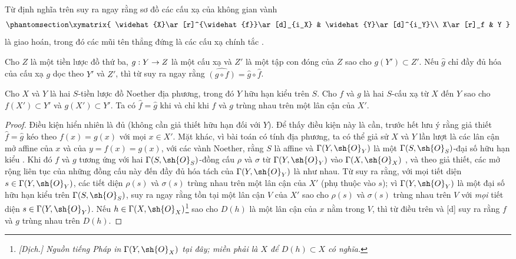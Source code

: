\documentclass[oneside]{amsart}
\makeatletter
\newcommand{\ega@arrow}[2]{\mathchoice{#1}{#2}{#2}{#2}}
\renewcommand{\to}{\ega@arrow{\longrightarrow}{\rightarrow}}
\let\EGAOriginalLabel\label
\renewcommand{\label}[1]{\phantomsection\EGAOriginalLabel{#1}}
\makeatother
\begin{document}
\begin{env}[10.9.2]
\label{I.10.9.2}
Từ định nghĩa trên suy ra ngay rằng sơ đồ các cấu xạ của không gian vành
\[
  \label{I.10.9.2.1}
  \xymatrix{
    \widehat{X}\ar[r]^{\widehat{f}}\ar[d]_{i_X} &
    \widehat{Y}\ar[d]^{i_Y}\\
    X\ar[r]_f &
    Y
  }
\]
là giao hoán, trong đó các mũi tên thẳng đứng là các cấu xạ chính tắc .
\end{env}

\begin{env}[10.9.3]
\label{I.10.9.3}
Cho $Z$ là một tiền lược đồ thứ ba, $g:Y\to Z$ là một cấu xạ và $Z'$ là một tập con đóng của $Z$ sao cho $g(Y')\subset Z'$.
Nếu $\widehat{g}$ chỉ đầy đủ hóa của cấu xạ $g$ dọc theo $Y'$ và $Z'$, thì từ  suy ra ngay rằng
$\widehat{(g\circ f)}=\widehat{g}\circ\widehat{f}$.
\end{env}

\begin{proposition}[10.9.4]
\label{I.10.9.4}
Cho $X$ và $Y$ là hai $S$-tiền lược đồ Noether địa phương, trong đó $Y$ hữu hạn kiểu trên $S$.
Cho $f$ và $g$ là hai $S$-cấu xạ từ $X$ đến $Y$ sao cho $f(X')\subset Y'$ và $g(X')\subset Y'$.
Ta có $\widehat{f}=\widehat{g}$ khi và chỉ khi $f$ và $g$ trùng nhau trên một lân cận của $X'$.
\end{proposition}

\begin{proof}
Điều kiện hiển nhiên là đủ (không cần giả thiết hữu hạn đối với $Y$).
Để thấy điều kiện này là cần, trước hết lưu ý rằng giả thiết $\widehat{f}=\widehat{g}$ kéo theo $f(x)=g(x)$ với mọi $x\in X'$.
Mặt khác, vì bài toán có tính địa phương, ta có thể giả sử $X$ và $Y$ lần lượt là các lân cận mở affine của $x$ và của $y=f(x)=g(x)$, với các vành Noether, rằng $S$ là affine và $\Gamma(Y,\sh{O}_Y)$ là một $\Gamma(S,\sh{O}_S)$-đại số hữu hạn kiểu .
Khi đó $f$ và $g$ tương ứng với hai $\Gamma(S,\sh{O}_S)$-đồng cấu $\rho$ và $\sigma$ từ $\Gamma(Y,\sh{O}_Y)$ vào $\Gamma(X,\sh{O}_X)$ , và theo giả thiết, các mở rộng liên tục của những đồng cấu này đến đầy đủ hóa tách của $\Gamma(Y,\sh{O}_Y)$ là như nhau.
Từ  suy ra rằng, với mọi tiết diện $s\in\Gamma(Y,\sh{O}_Y)$, các tiết diện $\rho(s)$ và $\sigma(s)$ trùng nhau trên một lân cận của $X'$ (phụ thuộc vào $s$); vì $\Gamma(Y,\sh{O}_Y)$ là một đại số hữu hạn kiểu trên $\Gamma(S,\sh{O}_S)$, suy ra ngay rằng tồn tại một lân cận $V$ của $X'$ sao cho $\rho(s)$ và $\sigma(s)$ trùng nhau trên $V$ với \emph{mọi} tiết diện $s\in\Gamma(Y,\sh{O}_Y)$.
Nếu $h\in\Gamma(X,\sh{O}_X)$\footnote{\emph{[Dịch.] Nguồn tiếng Pháp in $\Gamma(Y,\sh{O}_X)$ tại đây; miền phải là $X$ để $D(h)\subset X$ có nghĩa.}} sao cho $D(h)$ là một lân cận của $x$ nằm trong $V$, thì từ điều trên và [d] suy ra rằng $f$ và $g$ trùng nhau trên $D(h)$.
\end{proof}
\end{document}
